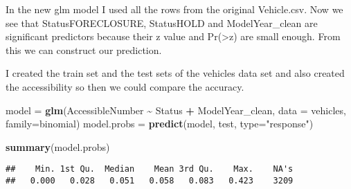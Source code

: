\documentclass[
]{article}
\newenvironment{Shaded}{\begin{snugshade}}{\end{snugshade}}
\newcommand{\AttributeTok}[1]{\textcolor[rgb]{0.13,0.29,0.53}{#1}}
\newcommand{\FunctionTok}[1]{\textcolor[rgb]{0.13,0.29,0.53}{\textbf{#1}}}
\newcommand{\NormalTok}[1]{#1}
\newcommand{\OtherTok}[1]{\textcolor[rgb]{0.56,0.35,0.01}{#1}}
\newcommand{\SpecialCharTok}[1]{\textcolor[rgb]{0.81,0.36,0.00}{\textbf{#1}}}
\newcommand{\StringTok}[1]{\textcolor[rgb]{0.31,0.60,0.02}{#1}}
\begin{document}
In the new glm model I used all the rows from the original Vehicle.csv.
Now we see that StatusFORECLOSURE, StatusHOLD and ModelYear\_clean are
significant predictors because their z value and
Pr(\textgreater\textbar z\textbar) are small enough. From this we can
construct our prediction.

\begin{Shaded}
\end{Shaded}

I created the train set and the test sets of the vehicles data set and
also created the accessibility so then we could compare the accuracy.

\begin{Shaded}
\begin{Highlighting}[]
\NormalTok{model }\OtherTok{=} \FunctionTok{glm}\NormalTok{(AccessibleNumber }\SpecialCharTok{\textasciitilde{}}\NormalTok{ Status }\SpecialCharTok{+}\NormalTok{ ModelYear\_clean, }\AttributeTok{data =}\NormalTok{ vehicles, }\AttributeTok{family=}\NormalTok{binomial)}
\NormalTok{model.probs }\OtherTok{=} \FunctionTok{predict}\NormalTok{(model, test, }\AttributeTok{type=}\StringTok{"response"}\NormalTok{)}

\FunctionTok{summary}\NormalTok{(model.probs)}
\end{Highlighting}
\end{Shaded}

\begin{verbatim}
##    Min. 1st Qu.  Median    Mean 3rd Qu.    Max.    NA's 
##   0.000   0.028   0.051   0.058   0.083   0.423    3209
\end{verbatim}
\end{document}
